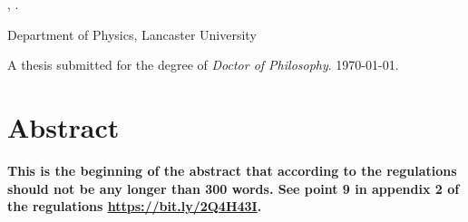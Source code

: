 \begin{center}
\textbf{\thesistitle}

\authorname, \authordegrees.

Department of Physics, Lancaster University

A thesis submitted for the degree of \textit{Doctor of Philosophy}. \monthyeardate\today.
\end{center}

\section*{\centering Abstract}

\textbf{This is the beginning of the abstract that according to the regulations should not be any longer than 300 words. See point 9 in appendix 2 of the regulations \url{https://bit.ly/2Q4H43I}.}
